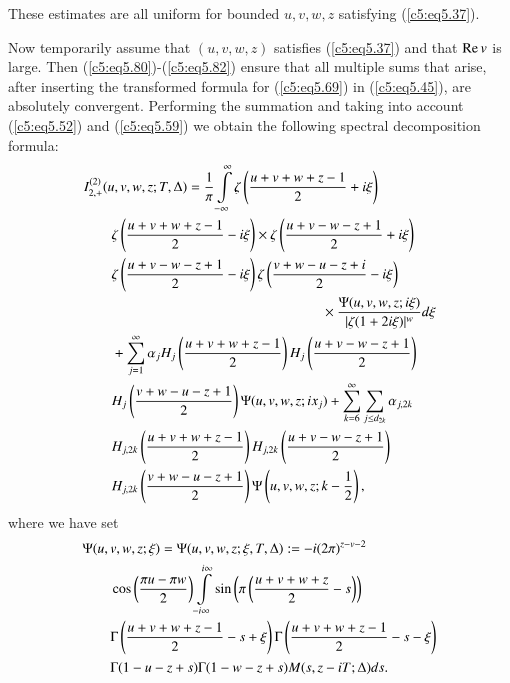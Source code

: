 These estimates are all uniform for bounded $u,v,w,z$ satisfying\break
(\ref{c5:eq5.37}). 

Now temporarily assume that $(u,v,w,z)$ satisfies (\ref{c5:eq5.37})
and that $\operatorname{Re} v$ is large. Then (\ref{c5:eq5.80})-(\ref{c5:eq5.82})
ensure that all multiple sums that arise, after inserting the
transformed formula for (\ref{c5:eq5.69}) in (\ref{c5:eq5.45}), are
absolutely convergent. Performing the summation and taking into
account (\ref{c5:eq5.52}) and (\ref{c5:eq5.59}) we obtain the
following spectral decomposition formula: 
\begin{align}
& I^{(2)}_{2,+}  (u,v,w,z;T,\Delta)  = \frac{1}{\pi}
  \int\limits^\infty_{-\infty} \zeta \left( 
\frac{u+v+w+z-1}{2} + i \xi \right)\label{c5:eq5.83}\\  
& \qquad  \zeta \left(\frac{u+v+w+z-1}{2} - i \xi \right) \times
\zeta \left(\frac{u+v-w-z+1}{2} + i \xi \right)\notag\\ 
& \qquad  \zeta \left(\frac{u+v-w-z+1}{2} - i \xi \right) \zeta
\left(\frac{v+w-u-z+i}{2} - i \xi \right)\notag\\ 
&\hspace{6cm}\times \frac{\Psi (u,v,w,z; i\xi)}{|\zeta(1+2i\xi)|^w} d
\xi\notag\\ 
& \qquad + \sum\limits^{\infty}_{j=1} \alpha_j H_j
\left(\frac{u+v+w+z-1}{2} \right) H_j \left(
\frac{u+v-w-z+1}{2}\right)\notag\\ 
&  \qquad H_j \left(\frac{v+w-u-z+1}{2} \right) \Psi (u,v,w,z;i x_j)
 + \sum\limits^\infty_{k=6} \sum\limits_{j \leq d_{2k}}
 \alpha_{j,2k}\notag\\ 
& \qquad H_{j,2k}  \left(\frac{u+v+w+z-1}{2} \right) H_{j,2k}
 \left(\frac{u+v-w-z+1}{2} \right)\notag\\  
 & \qquad H_{j,2k} \left(\frac{v+w-u-z+1}{2} \right) \Psi
 \left(u,v,w,z;k-\frac{1}{2} \right),\notag 
\end{align}
where we have set
\begin{align}
& \Psi (u,v,w,z;\xi) = \Psi (u,v,w,z;\xi,T,\Delta) : = 
-i (2\pi)^{z-v-2}\label{c5:eq5.84}\\
& \qquad \cos \left(\frac{\pi u - \pi w}{2} \right)
\int\limits^{i\infty}_{-i\infty} \sin \left(\pi
\left(\frac{u+v+w+z}{2} -s \right) \right)\notag\\ 
& \qquad \Gamma \left(\frac{u+v+w+z-1}{2} -s + \xi\right) \Gamma
\left(\frac{u+v+w+z-1}{2} -s -\xi \right)\notag\\ 
& \qquad  \Gamma (1-u-z+s) \Gamma (1-w-z+s) M (s, z - iT;\Delta)
ds.\notag  
\end{align}

